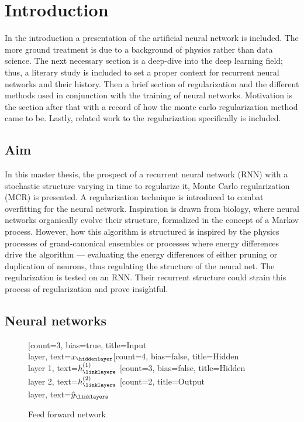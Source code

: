 
\chapter{Introduction}

In the introduction a presentation of the artificial neural network is included. The more ground treatment is due to a background of physics rather than data science. The next necessary section is a deep-dive into the deep learning field; thus, a literary study is included to set a proper context for recurrent neural networks and their history. Then a brief section of regularization and the different methods used in conjunction with the training of neural networks. Motivation is the section after that with a record of how the monte carlo regularization method came to be. Lastly, related work to the regularization specifically is included.

\section{Aim}

In this master thesis, the prospect of a recurrent neural network (RNN) with a stochastic structure varying in time to regularize it, Monte Carlo regularization (MCR) is presented. A regularization technique is introduced to combat overfitting for the neural network. Inspiration is drawn from biology, where neural networks organically evolve their structure, formalized in the concept of a Markov process. However, how this algorithm is structured is inspired by the physics processes of grand-canonical ensembles or processes where energy differences drive the algorithm — evaluating the energy differences of either pruning or duplication of neurons, thus regulating the structure of the neural net. The regularization is tested on an RNN. Their recurrent structure could strain this process of regularization and prove insightful. 

\section{Neural networks}

\begin{figure}[h]
    \centering
    \begin{neuralnetwork}[height=4]
        \newcommand{\x}[2]{$x_#2$}
        \newcommand{\y}[2]{$\hat{y}_#2$}
        \newcommand{\hfirst}[2]{\small $h^{(1)}_#2$}
        \newcommand{\hsecond}[2]{\small $h^{(2)}_#2$}
        [count=3, bias=true, title=Input\\layer, text=\x]
        \hiddenlayer[count=4, bias=false, title=Hidden\\layer 1, text=\hfirst] \linklayers
        \hiddenlayer[count=3, bias=false, title=Hidden\\layer 2, text=\hsecond] \linklayers
        \outputlayer[count=2, title=Output\\layer, text=\y] \linklayers
    \end{neuralnetwork}
    \caption{Feed forward network}
\end{figure}


